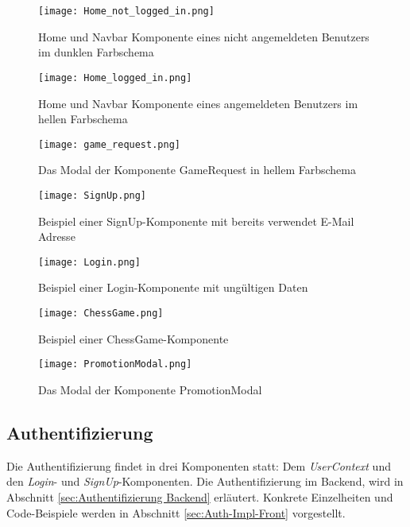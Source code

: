   \begin{figure}[htbp]
  \centering
  \texttt{[image: Home\_not\_logged\_in.png]}
  \caption{Home und Navbar Komponente eines nicht angemeldeten Benutzers im dunklen Farbschema}
  \label{fig:home-not-logged-in}
\end{figure}

  
    \begin{figure}[htbp]
    \centering
  \texttt{[image: Home\_logged\_in.png]}
  \caption{Home und Navbar Komponente eines angemeldeten Benutzers im hellen Farbschema}
  \label{fig:home-logged-in}
\end{figure}

      \begin{figure}[htbp]
      \centering
  \texttt{[image: game\_request.png]}
  \caption{Das Modal der Komponente GameRequest in hellem Farbschema}
  \label{fig:game-request}
\end{figure}


      \begin{figure}[htbp]
      \centering
  \texttt{[image: SignUp.png]}
  \caption{Beispiel einer SignUp-Komponente mit bereits verwendet E-Mail Adresse} 
  \label{fig:SignUp}
\end{figure}

      \begin{figure}[htbp]
      \centering
  \texttt{[image: Login.png]}
  \caption{Beispiel einer Login-Komponente mit ungültigen Daten} 
  \label{fig:Login}
\end{figure}

      \begin{figure}[htbp]
      \centering
  \texttt{[image: ChessGame.png]}
  \caption{Beispiel einer ChessGame-Komponente} 
  \label{fig:chess-game}
\end{figure}
        
      \begin{figure}[htbp]
      \centering
  \texttt{[image: PromotionModal.png]}
  \caption{Das Modal der Komponente PromotionModal}
  \label{fig:PromotionModal}
\end{figure}

    
   
   \subsection{Authentifizierung}
   \label{sec:Autehtifizierung Frontend}
Die Authentifizierung findet in drei Komponenten statt: Dem \textit{UserContext} und den \textit{Login}- und \textit{SignUp}-Komponenten. Die Authentifizierung im Backend, wird in Abschnitt \ref{sec:Authentifizierung Backend} erläutert. Konkrete Einzelheiten und Code-Beispiele werden in Abschnitt \ref{sec:Auth-Impl-Front} vorgestellt.

